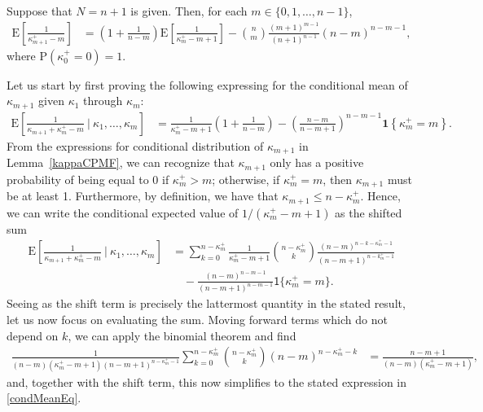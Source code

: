 \documentclass[stsy,dblanonrev]{amers/INFORMS-STSY-Template-26-02-2026/informs4}
\newcommand{\E}[1]{{\mathrm{E}\left[#1\right]}}
\newcommand{\PP}[1]{\mathrm{P}\left(#1\right)}
\begin{document}
\begin{lemma}\label{meanRecur}
Suppose that $N = n +1$ is given. Then, for each $m \in \{0, 1, \dots, n - 1\}$,
\begin{align}
\E{\frac{1}{\kappa_{m+1}^+ - m} }
&=
\left(1 + \frac{1}{n-m}\right)\E{\frac{1}{\kappa_m^+ - m + 1}}
-
{n \choose m}\frac{(m+1)^{m-1}}{(n+1)^{n-1}}(n-m)^{n-m-1}
,
\end{align}
where $\PP{\kappa_0^+ = 0} = 1$.
\end{lemma}
 Let us start by first proving the following expressing for the conditional mean of $\kappa_{m+1}$ given $\kappa_1$ through $\kappa_m$:
\begin{align}
\E{\frac{1}{\kappa_{m+1} + \kappa_m^+ - m} ~\bigg|~ \kappa_1, \dots, \kappa_m}
&=
\frac{1}{\kappa_m^+ - m + 1}\left(1 + \frac{1}{n-m}\right)
-
\left(\frac{n-m}{n-m+1}\right)^{n-m-1}\mathbf{1}\left\{ \kappa_m^+ = m\right\}
\label{condMeanEq}
.
\end{align}
From the expressions for conditional distribution of $\kappa_{m+1}$ in Lemma~\ref{kappaCPMF}, we can recognize that $\kappa_{m+1}$ only has a positive probability of being equal to 0 if $\kappa_m^+ > m$; otherwise, if $\kappa_m^+ = m$, then $\kappa_{m+1}$ must be at least 1. Furthermore, by definition, we have that $\kappa_{m+1} \leq n - \kappa_m^+$. Hence, we can write the conditional expected value of $1/(\kappa_m^+ - m + 1)$ as the shifted sum
\begin{align}
\E{\frac{1}{\kappa_{m+1} + \kappa_m^+ - m} ~\bigg|~ \kappa_1, \dots, \kappa_m}
&=
\sum_{k=0}^{n-\kappa_m^+}
\frac{1}{\kappa_m^+ - m + 1}
{n - \kappa_m^+ \choose k}
\frac{\left(n-m\right)^{n-k-\kappa_{m}^+-1}}{(n-m+1)^{n-k_m^+-1}}
\nonumber
\\
&
\quad
-
\frac{\left(n-m\right)^{n-m-1}}{(n-m+1)^{n-m-1}}
\mathsf{1}\{\kappa_m^+ = m\}
.
\end{align}
Seeing as the shift term is precisely the lattermost quantity in the stated result, let us now focus on evaluating the sum. Moving forward terms which do not depend on $k$, we can apply the binomial theorem and find
\begin{align}
\frac{1}{(n-m)(\kappa_m^+ - m + 1)(n-m+1)^{n-\kappa_m^+-1}}
\sum_{k=0}^{n-\kappa_m^+}
{n - \kappa_m^+ \choose k}
\left(n-m\right)^{n-\kappa_{m}^+-k}
&=
\frac{n-m+1}{(n-m)(\kappa_m^+ - m + 1)}
,
\end{align}
and, together with the shift term, this now simplifies to the stated expression in \eqref{condMeanEq}.
\end{document}
